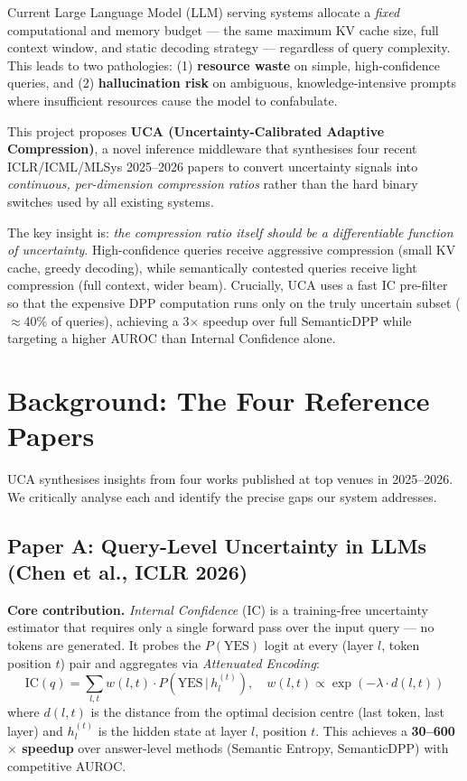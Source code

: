 \documentclass[11pt, a4paper]{article}
\newcommand{\IC}{\mathrm{IC}}
\begin{document}
Current Large Language Model (LLM) serving systems allocate a \textit{fixed} computational and memory budget --- the same maximum KV cache size, full context window, and static decoding strategy --- regardless of query complexity. This leads to two pathologies: (1) \textbf{resource waste} on simple, high-confidence queries, and (2) \textbf{hallucination risk} on ambiguous, knowledge-intensive prompts where insufficient resources cause the model to confabulate.

This project proposes \textbf{UCA (Uncertainty-Calibrated Adaptive Compression)}, a novel inference middleware that synthesises four recent ICLR/ICML/MLSys 2025--2026 papers to convert uncertainty signals into \textit{continuous, per-dimension compression ratios} rather than the hard binary switches used by all existing systems.

The key insight is: \emph{the compression ratio itself should be a differentiable function of uncertainty}. High-confidence queries receive aggressive compression (small KV cache, greedy decoding), while semantically contested queries receive light compression (full context, wider beam). Crucially, UCA uses a fast IC pre-filter so that the expensive DPP computation runs only on the truly uncertain subset ($\approx$40\% of queries), achieving a 3$\times$ speedup over full SemanticDPP while targeting a higher AUROC than Internal Confidence alone.

\section{Background: The Four Reference Papers}
\label{sec:background}

UCA synthesises insights from four works published at top venues in 2025--2026. We critically analyse each and identify the precise gaps our system addresses.

\subsection{Paper A: Query-Level Uncertainty in LLMs (Chen et al., ICLR 2026)}
\label{sec:ic}

\textbf{Core contribution.} \emph{Internal Confidence} (IC) is a training-free uncertainty estimator that requires only a single forward pass over the input query --- no tokens are generated. It probes the $P(\text{YES})$ logit at every (layer $l$, token position $t$) pair and aggregates via \emph{Attenuated Encoding}:
\begin{equation}
\IC(q) = \sum_{l,t} w(l,t)\cdot P\!\left(\text{YES}\,\big|\, h_l^{(t)}\right), \quad w(l,t) \propto \exp\!\left(-\lambda \cdot d(l,t)\right)
\label{eq:ic}
\end{equation}
where $d(l,t)$ is the distance from the optimal decision centre (last token, last layer) and $h_l^{(t)}$ is the hidden state at layer $l$, position $t$. This achieves a \textbf{30--600$\times$ speedup} over answer-level methods (Semantic Entropy, SemanticDPP) with competitive AUROC.
\end{document}
